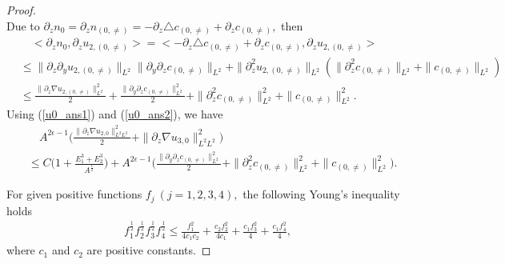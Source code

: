 \documentclass[10pt,a4paper]{amsart}
\begin{document}
\begin{proof}
\begin{equation}
		\end{equation}
		Due to $\partial_zn_{0}=\partial_zn_{(0,\neq)}=-\partial_z\triangle c_{(0,\neq)}+\partial_zc_{(0,\neq)},$ then 
		\begin{equation}\label{u0_ans2}
			\begin{aligned}
				&\quad<\partial_zn_{0}, \partial_zu_{2,(0,\neq)}>
				=<-\partial_z\triangle c_{(0,\neq)}+\partial_zc_{(0,\neq)}, 	\partial_zu_{2,(0,\neq)}>\\
				&\leq \|\partial_z\partial_y u_{2,(0,\neq)}\|_{L^2}
				\|\partial_y\partial_z c_{(0,\neq)}\|_{L^2}
				+\|\partial_z^2u_{2,(0,\neq)}\|_{L^2}
				(\|\partial_z^2c_{(0,\neq)}\|_{L^2}
				+\|c_{(0,\neq)}\|_{L^2})
				\\
				&\leq \frac{\|\partial_z \nabla u_{2,(0,\neq)}\|_{L^2}^2
				}{2}+\frac{\|\partial_y\partial_z c_{(0,\neq)}\|_{L^2}^2}{2}
				+\|\partial_z^2 c_{(0,\neq)}\|_{L^2}^2
				+\| c_{(0,\neq)}\|_{L^2}^2.
			\end{aligned}
		\end{equation}
		Using (\ref{u0_ans1}) and (\ref{u0_ans2}), we have 
		\begin{equation}\label{u0_ans3}
			\begin{aligned}
				&\quad 
				A^{2\epsilon-1}\Big(\frac{\|\partial_z\nabla u_{2,0}\|_{L^2L^2}^2}{2}
				+\|\partial_z\nabla u_{3,0}\|_{L^2L^2}^2\Big)\\
				&\leq C\Big(1+\frac{E_1^3+E_2^3}{A^{\frac{\epsilon}{2}}}\Big)
				+A^{2\epsilon-1}\Big(\frac{\|\partial_y\partial_z c_{(0,\neq)}\|_{L^2}^2}{2}
				+\|\partial_z^2 c_{(0,\neq)}\|_{L^2}^2
				+\| c_{(0,\neq)}\|_{L^2}^2\Big).
			\end{aligned}
		\end{equation}
		
		For given positive functions $f_j~(j=1,2,3,4),$  the following Young's inequality holds
		\begin{equation}\label{young_1}
			\begin{aligned}
				f_1^{\frac{1}{2}}f_2^{\frac{1}{2}}
				f_3^{\frac{1}{2}}f_4^{\frac{1}{2}}
				\leq \frac{f_1^2}{4c_1c_2}+\frac{c_2f_2^2}{4c_1}
				+\frac{c_1f_3^2}{4}+\frac{c_1f_4^2}{4}, 
			\end{aligned}
		\end{equation}
		where $c_1$ and $c_2$ are positive constants.
		

\end{proof}
\end{document}
